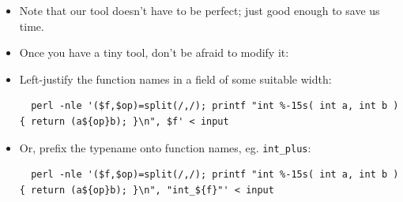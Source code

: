 \documentclass[aspectratio=169]{beamer}
\newcommand{\pitem}{\pause \item}
\begin{document}
\begin{frame}[fragile]
    \begin{itemize}
    \item
      Note that our tool doesn't have to be perfect;
      just good enough to save us time.
 
    \pitem
    Once you have a tiny tool, don't be afraid to modify it:

    \item
    Left-justify the function names in a field of some suitable width:

\tiny
\begin{verbatim}
  perl -nle '($f,$op)=split(/,/); printf "int %-15s( int a, int b ) { return (a${op}b); }\n", $f' < input
\end{verbatim}
\small

    \pitem
    Or, prefix the typename onto function names, eg. \verb+int_plus+:

\tiny
\begin{verbatim}
  perl -nle '($f,$op)=split(/,/); printf "int %-15s( int a, int b ) { return (a${op}b); }\n", "int_${f}"' < input
\end{verbatim}
\small


%
%
%



\end{itemize}
\end{frame}
\end{document}
